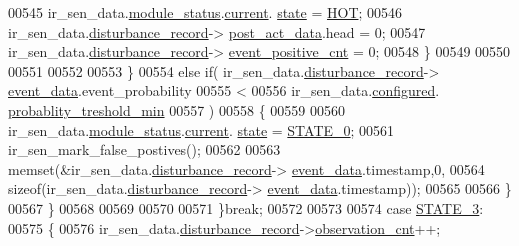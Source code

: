 \begin{DoxyCode}
00545                          ir\_sen\_data.\hyperlink{a00023_a5a53c391562b059eb744ac679f3765ca}{module\_status}.\hyperlink{a00017_ab8af48cdbba92b3ae39c4470e53af944}{current}.
      \hyperlink{a00017_a6b8d8e916bc56265a3fd279bd26b6d1b}{state} = \hyperlink{a00021_a1eb14cc432874ddacd1934791dbe12a3}{HOT};
00546                          ir\_sen\_data.\hyperlink{a00023_ac9b38e2c1d3f1013a88d33506c754152}{disturbance\_record}->
      \hyperlink{a00028_a9c699c0cc82d0baa6e49195f185ab34f}{post\_act\_data}.head = 0;
00547                          ir\_sen\_data.\hyperlink{a00023_ac9b38e2c1d3f1013a88d33506c754152}{disturbance\_record}->
      \hyperlink{a00028_a7397b9d76d4b57500f27bb23d258a18a}{event\_positive\_cnt} = 0;
00548                            \}
00549 
00550 
00551 
00552 
00553                    \}
00554                    \textcolor{keywordflow}{else} \textcolor{keywordflow}{if}( ir\_sen\_data.\hyperlink{a00023_ac9b38e2c1d3f1013a88d33506c754152}{disturbance\_record}->
      \hyperlink{a00028_a8c0bda69e71ef674e60da47ad0be9ab0}{event\_data}.event\_probability
00555                             <
00556                            ir\_sen\_data.\hyperlink{a00023_a94b2d1f6ea4ab334c74d24984dd27843}{configured}.
      \hyperlink{a00021_aa59261f74183d4f9e909ac425e0bea35}{probablity\_treshold\_min}
00557                            )
00558                          \{
00559 
00560                              ir\_sen\_data.\hyperlink{a00023_a5a53c391562b059eb744ac679f3765ca}{module\_status}.\hyperlink{a00017_ab8af48cdbba92b3ae39c4470e53af944}{current}.
      \hyperlink{a00017_a6b8d8e916bc56265a3fd279bd26b6d1b}{state} = \hyperlink{a00021_ad6739dbbe5581cac99b7dc8a5e09949c}{STATE\_0};
00561                              ir\_sen\_mark\_false\_postives();
00562 
00563                              memset(&ir\_sen\_data.\hyperlink{a00023_ac9b38e2c1d3f1013a88d33506c754152}{disturbance\_record}->
      \hyperlink{a00028_a8c0bda69e71ef674e60da47ad0be9ab0}{event\_data}.timestamp,0,
00564                                      \textcolor{keyword}{sizeof}(ir\_sen\_data.\hyperlink{a00023_ac9b38e2c1d3f1013a88d33506c754152}{disturbance\_record}->
      \hyperlink{a00028_a8c0bda69e71ef674e60da47ad0be9ab0}{event\_data}.timestamp));
00565 
00566                         \}
00567              \}
00568 
00569 
00570 
00571         \}\textcolor{keywordflow}{break};
00572 
00573 
00574         \textcolor{keywordflow}{case} \hyperlink{a00021_ad87f1bc8466a25d9f7da68717d324a22}{STATE\_3}: 
00575         \{
00576             ir\_sen\_data.\hyperlink{a00023_ac9b38e2c1d3f1013a88d33506c754152}{disturbance\_record}->\hyperlink{a00028_ad5b0bac02ce266b91b2b52a1c3ea1d78}{observation\_cnt}++;

\end{DoxyCode}
